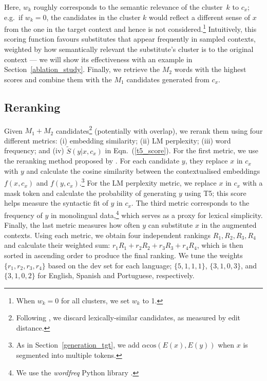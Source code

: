 \documentclass[11pt]{article}
\newcommand{\secref}[2][]{Section#1~\ref{#2}\xspace}
\newcommand{\eqnref}[2][]{Eqn#1.~(\ref{#2})\xspace}
\begin{document}
Here,  $w_k$ roughly corresponds to the semantic relevance of the cluster~$k$ to $c_x$; e.g.\ if $w_k=0$, the candidates in the cluster $k$ would reflect a different sense of $x$ from the one in the target context and hence is not considered.\footnote{When $w_k =0$ for all clusters, we set $w_k$ to 1.} Intuitively, this scoring function favours substitutes that appear frequently in sampled contexts, weighted by how semantically relevant the substitute's cluster is to the original context --- we will show its effectiveness with an example in \secref{ablation_study}. %
Finally, we retrieve the $M_2$ words with the highest scores and combine them with the $M_1$ candidates generated from $c_x$.

\subsection{Reranking}
Given $M_1{+}M_2$ candidates\footnote{Following \citet{wada-etal-2022-unsupervised}, we discard lexically-similar candidates, as measured by edit distance.} (potentially with overlap), we rerank them using four different metrics: (i) embedding similarity; (ii) LM perplexity; (iii) word frequency; and (iv) $\tilde{S}(y|x,c_x)$ in \eqnref[]{t5_score}. For the first metric, we use the reranking method proposed by \citet{wada-etal-2022-unsupervised}. For each candidate $y$, they replace $x$ in $c_x$ with $y$ and calculate the cosine similarity between the contextualised embeddings $f(x, c_x)$ and $f(y, c_x)$.\footnote{As in \secref[]{generation_tgt}, we add $\alpha \mathrm{cos}(E(x),E(y))$ when $x$ is segmented into multiple tokens.} For the LM perplexity metric, we replace $x$ in $c_x$ with a mask token and calculate the probability of generating $y$ using T5; this score helps measure the syntactic fit of $y$ in $c_x$. The third metric corresponds to the frequency of $y$ in monolingual data,\footnote{We use the {\it wordfreq} Python library \cite{robyn_speer_2022_7199437}.} which serves as a proxy for lexical simplicity. Finally, the last metric measures how often $y$ can substitute $x$ in the augmented contexts. Using each metric, we obtain four independent rankings $R_1, R_2, R_3, R_4$ and calculate their weighted sum: $r_1R_1{+}r_2R_2{+}r_3R_3{+}r_4R_4$, 
 which is then sorted in ascending order to produce the final ranking. We tune the weights $\{r_1, r_2, r_3, r_4\}$ based on the dev set for each language; $\{5, 1, 1, 1\}$, $\{3, 1, 0, 3\}$, and $\{3, 1, 0, 2\}$ for English, Spanish and Portuguese, respectively.
\end{document}
